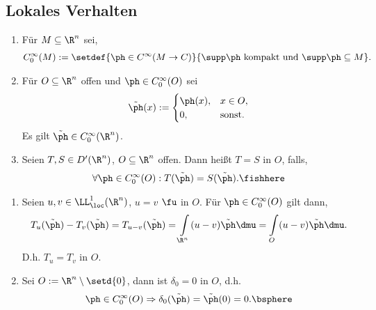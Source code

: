 \subsection{Lokales Verhalten}

\begin{defn}
\label{defn:3.20}
\begin{enumerate}[label=\arabic{*}.)]
  \item Für $M\subseteq \R^n$ sei,
\begin{align*}
C_0^\infty(M) := \setdef{\ph\in C^\infty(M\to C)}{\supp \ph \text{ kompakt und
}\supp\ph \subseteq M}.
\end{align*}
\item Für $O\subseteq \R^n$ offen und $\ph\in C_0^\infty(O)$ sei
\begin{align*}
\tilde{\ph}(x) := 
\begin{cases}
\ph(x), & x\in O,\\
0, &\text{sonst}.
\end{cases}
\end{align*}
Es gilt $\tilde{\ph}\in C_0^\infty(\R^n)$.
\item Seien $T,S\in D'(\R^n)$, $O\subseteq \R^n$ offen. Dann heißt $T=S$ in
$O$, falls,
\begin{align*}
\forall \ph\in C_0^\infty(O) : T(\tilde{\ph}) = S(\tilde{\ph}).\fishhere
\end{align*}
\end{enumerate}
\end{defn}

\begin{bsp}
\label{bsp:3.21}
\begin{enumerate}[label=\arabic{*}.)]
  \item Seien $u,v\in\LL_\loc^1(\R^n)$, $u=v$ $\fu$ in $O$. Für $\ph\in
  C_0^\infty(O)$ gilt dann,
\begin{align*}
T_u(\tilde{\ph}) - T_v(\tilde{\ph}) = T_{u-v}(\tilde{\ph}) = \int\limits_{\R^n}
(u-v)\tilde{\ph}\dmu = \int\limits_O (u-v)\tilde{\ph}\dmu.
\end{align*}
D.h. $T_u = T_v$ in $O$.
\item Sei $O:= \R^n\setminus\setd{0}$, dann ist $\delta_0 = 0$ in $O$, d.h.
\begin{align*}
\ph\in C_0^\infty(O) \Rightarrow \delta_0(\tilde{\ph}) = \tilde{\ph}(0) =
0.\bsphere
\end{align*}
\end{enumerate}
\end{bsp}

